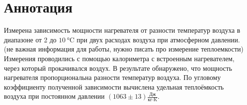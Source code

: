 \section*{Аннотация}

Измерена зависимость мощности нагревателя от разности температур воздуха в диапазоне от 2 до $\SI{10}{\celsius}$ при двух расходах воздуха при атмосферном давлении. (не важная информация для работы, нужно писать про измерение теплоемкости) Измерения проводились с помощью калориметра с встроенным нагревателем, через который прокачивался воздух. В результате обнаружено, что  мощность нагревателя пропорциональна разности температур воздуха. По угловому коэффициенту полученной зависимости вычислена удельная теплоёмкость воздуха при постоянном давлении $(1063 \pm 13)  \frac{\text{Дж}}{\text{кг}\cdot\text{K}}$. 